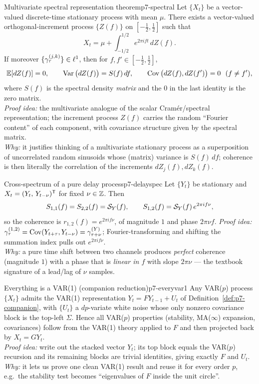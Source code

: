 \begin{theorem}{Multivariate spectral representation theorem}{p7-spectral}
Let $\{X_t\}$ be a vector-valued discrete-time stationary process with mean
$\mu$. There exists a vector-valued orthogonal-increment process $\{Z(f)\}$ on
$[-\tfrac12,\tfrac12]$ such that
\[
X_t=\mu+\int_{-1/2}^{1/2} e^{2\pi i f t}\,dZ(f).
\]
If moreover $\{\gamma_\tau^{(j,k)}\}\in\ell^1$, then for $f,f'\in[-\tfrac12,\tfrac12]$,
\[
\mathbb{E}[dZ(f)]=0,\qquad
\operatorname{Var}\big(dZ(f)\big)=S(f)\,df,\qquad
\operatorname{Cov}\big(dZ(f),dZ(f')\big)=0\ \ (f\ne f'),
\]
where $S(f)$ is the spectral density \emph{matrix} and the $0$ in the last
identity is the zero matrix.\\
\textit{Proof idea:} the multivariate analogue of the scalar Cram\'er/spectral
representation; the increment process $Z(f)$ carries the random ``Fourier
content'' of each component, with covariance structure given by the spectral
matrix.\\
\textit{Why:} it justifies thinking of a multivariate stationary process as a
superposition of uncorrelated random sinusoids whose (matrix) variance is
$S(f)\,df$; coherence is then literally the correlation of the increments
$dZ_j(f),dZ_k(f)$.
\end{theorem}

\begin{proposition}{Cross-spectrum of a pure delay process}{p7-delayspec}
Let $\{Y_t\}$ be stationary and $X_t=(Y_t,\,Y_{t-\nu})^{\mathsf{T}}$ for fixed
$\nu\in\mathbb{Z}$. Then
\[
S_{1,1}(f)=S_{2,2}(f)=\mathcal{S}_Y(f),\qquad
S_{1,2}(f)=\mathcal{S}_Y(f)\,e^{2\pi i f\nu},
\]
so the coherence is $r_{1,2}(f)=e^{2\pi i f\nu}$, of magnitude $1$ and phase
$2\pi\nu f$.
\textit{Proof idea:} $\gamma_\tau^{(1,2)}=\operatorname{Cov}(Y_{t+\tau},Y_{t-\nu})
=\gamma_{\tau+\nu}^{(Y)}$; Fourier-transforming and shifting the summation index
pulls out $e^{2\pi i f\nu}$.\\
\textit{Why:} a pure time shift between two channels produces \emph{perfect}
coherence (magnitude $1$) with a phase that is \emph{linear in $f$} with slope
$2\pi\nu$ --- the textbook signature of a lead/lag of $\nu$ samples.
\end{proposition}

\begin{theorem}{Everything is a VAR(1) (companion reduction)}{p7-everyvar1}
Any VAR($p$) process $\{X_t\}$ admits the VAR(1) representation
$Y_t=FY_{t-1}+U_t$ of Definition~\ref{def:p7-companion}, with
$\{U_t\}$ a $dp$-variate white noise whose only nonzero covariance block is the
top-left $\Sigma$. Hence all VAR($p$) properties (stability, MA($\infty$)
expansion, covariances) follow from the VAR(1) theory applied to $F$ and then
projected back by $X_t=GY_t$.\\
\textit{Proof idea:} write out the stacked vector $Y_t$; its top block equals
the VAR($p$) recursion and its remaining blocks are trivial identities, giving
exactly $F$ and $U_t$.\\
\textit{Why:} it lets us prove one clean VAR(1) result and reuse it for every
order $p$, e.g.\ the stability test becomes ``eigenvalues of $F$ inside the unit
circle''.
\end{theorem}


